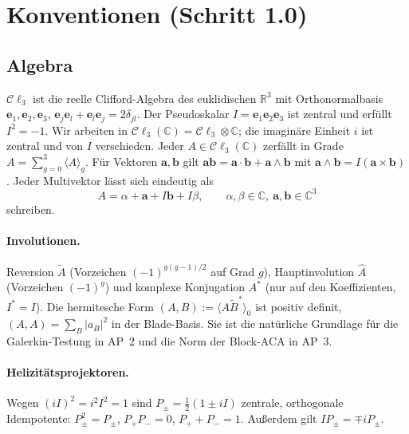 \documentclass[11pt, a4paper]{article}
\newcommand{\mvec}[1]{\boldsymbol{#1}}
\newcommand{\cl}{\mathcal{C}\ell_{3}}
\newcommand{\clc}{\mathcal{C}\ell_{3}(\mathbb{C})}
\newcommand{\grade}[2]{\langle #1\rangle_{#2}}
\theoremstyle{plain}
\theoremstyle{definition}
\begin{document}
\section{Konventionen (Schritt 1.0)}

\subsection{Algebra}
$\cl$ ist die reelle Clifford-Algebra des euklidischen $\mathbb{R}^3$ mit
Orthonormalbasis $\mvec{e}_1,\mvec{e}_2,\mvec{e}_3$, $\mvec{e}_j\mvec{e}_l +
\mvec{e}_l\mvec{e}_j = 2\delta_{jl}$. Der Pseudoskalar $I =
\mvec{e}_1\mvec{e}_2\mvec{e}_3$ ist zentral und erfüllt $I^2=-1$. Wir arbeiten in
$\clc = \cl\otimes\mathbb{C}$; die imaginäre Einheit $i$ ist zentral und von $I$
verschieden. Jeder $A\in\clc$ zerfällt in Grade $A = \sum_{g=0}^3
\grade{A}{g}$. Für Vektoren $\mvec{a},\mvec{b}$ gilt $\mvec{a}\mvec{b} =
\mvec{a}\cdot\mvec{b} + \mvec{a}\wedge\mvec{b}$ mit $\mvec{a}\wedge\mvec{b} =
I(\mvec{a}\times\mvec{b})$. Jeder Multivektor lässt sich eindeutig als
\begin{equation}\label{eq:param}
  A = \alpha + \mvec{a} + I\mvec{b} + I\beta,\qquad \alpha,\beta\in\mathbb{C},\
  \mvec{a},\mvec{b}\in\mathbb{C}^3
\end{equation}
schreiben.

\paragraph{Involutionen.} Reversion $\tilde{A}$ (Vorzeichen $(-1)^{g(g-1)/2}$ auf
Grad $g$), Hauptinvolution $\hat{A}$ (Vorzeichen $(-1)^g$) und komplexe
Konjugation $A^*$ (nur auf den Koeffizienten, $I^*=I$). Die hermitesche Form
$(A,B) := \grade{A\tilde{B}^*}{0}$ ist positiv definit, $(A,A) = \sum_{B}
|a_B|^2$ in der Blade-Basis. Sie ist die natürliche Grundlage für die
Galerkin-Testung in AP~2 und die Norm der Block-ACA in AP~3.

\paragraph{Helizitätsprojektoren.} Wegen $(iI)^2 = i^2I^2 = 1$ sind $P_\pm =
\tfrac12(1\pm iI)$ zentrale, orthogonale Idempotente: $P_\pm^2 = P_\pm$, $P_+P_-=0$,
$P_++P_-=1$. Außerdem gilt $IP_\pm = \mp i P_\pm$.
\end{document}
